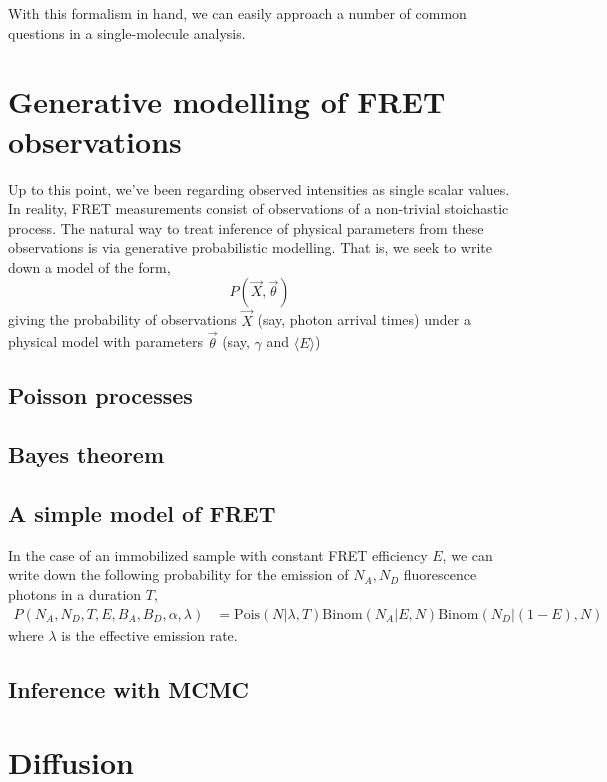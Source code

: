 \documentclass{article}
\newcommand{\mean}[1]{\ensuremath{\langle #1 \rangle}}
\begin{document}
With this formalism in hand, we can easily approach a number of common
questions in a single-molecule analysis.


\section{Generative modelling of FRET observations}

Up to this point, we've been regarding observed intensities as single scalar
values. In reality, FRET measurements consist of observations of a
non-trivial stoichastic process. The natural way to treat inference of
physical parameters from these observations is via generative
probabilistic modelling. That is, we seek to write down a model of the
form,
\[ P(\vec X, \vec\theta) \]
giving the probability of observations $\vec X$ (say, photon arrival times)
under a physical model with parameters $\vec\theta$ (say, $\gamma$ and $\mean{E}$)

\subsection{Poisson processes}
\subsection{Bayes theorem}
\subsection{A simple model of FRET}
In the case of an immobilized sample with constant FRET efficiency
$E$, we can write down the following probability for the emission of $N_A,
N_D$ fluorescence photons in a duration $T$,
\newcommand{\binomial}{\ensuremath{\mathrm{Binom}}}
\newcommand{\pois}{\ensuremath{\mathrm{Pois}}}
\begin{align*}
  P(N_A, N_D, T, E, B_A, B_D, \alpha, \lambda)
  & = \pois(N \vert \lambda, T)
      \binomial(N_A \vert E, N)
      \binomial(N_D \vert (1-E), N)
\end{align*}
where $\lambda$ is the effective emission rate.

\subsection{Inference with MCMC}

\section{Diffusion}
\end{document}
